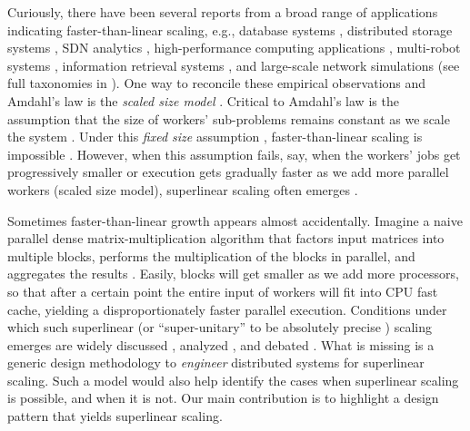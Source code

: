 Curiously, there have been several reports from a broad range of applications indicating faster-than-linear scaling, e.g., database systems \cite{scalability-analyzed, 10.5555/1012889.1012894}, distributed storage systems \cite{271208, dobb-2, icsoft20}, SDN analytics \cite{sdn-analytitcs}, high-performance computing applications \cite{556383, 7733347, 6483679}, multi-robot systems \cite{10.1007/978-3-319-77610-1}, information retrieval systems \cite{dobb-1, dobb-2}, and large-scale network simulations \cite{10.1145/3627703.3629574} (see full taxonomies in \cite{7733347, 80148}). %
One way to reconcile these empirical observations and Amdahl's law is the \emph{scaled size model} \cite{556383}. Critical to Amdahl's law is the assumption that the size of workers' sub-problems remains constant as we scale the system \cite{10.1145/42411.42415}. Under this \emph{fixed size} assumption \cite{556383}, faster-than-linear scaling is impossible \cite{10.1016/0167-8191(86)90024-4}. However, when this assumption fails, say, when the workers' jobs get progressively smaller or execution gets gradually faster as we add more parallel workers (scaled size model), superlinear scaling often emerges \cite{scalability-analyzed, sdn-analytitcs, 6483679, 10.1007/978-3-319-77610-1}.

Sometimes faster-than-linear growth appears almost accidentally. Imagine a naive parallel dense matrix-multiplication algorithm that factors input matrices into multiple blocks, performs the multiplication of the blocks in parallel, and aggregates the results \cite{7733347}. Easily, blocks will get smaller as we add more processors, so that after a certain point the entire input of workers will fit into CPU fast cache, yielding a disproportionately faster parallel execution. Conditions under which such superlinear (or ``super-unitary'' to be absolutely precise \cite{80148}) scaling emerges are widely discussed \cite{556383, dobb-1, dobb-2}, analyzed \cite{80148, 7733347}, and debated \cite{gunther-hotsos, 10.1016/0167-8191(86)90024-4, 10.1145/2773212.2789974}. What is missing is a generic design methodology to \emph{engineer} distributed systems for superlinear scaling. Such a model would also help identify the cases when superlinear scaling is possible, and when it is not. 
Our main contribution is to highlight a design pattern that yields superlinear scaling.

